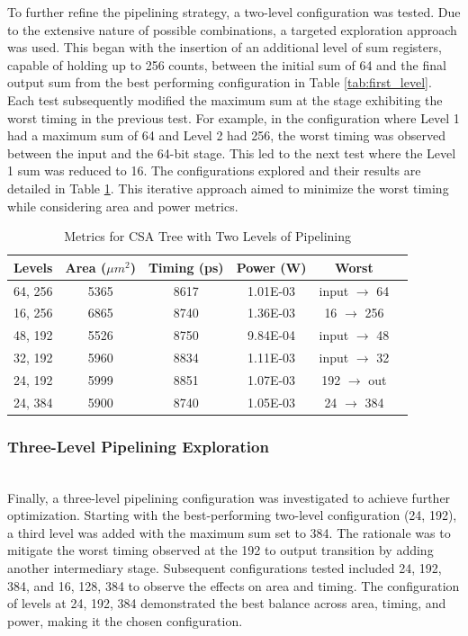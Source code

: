 \documentclass[conference]{IEEEtran}
\begin{document}
To further refine the pipelining strategy, a two-level configuration was tested. Due to the extensive nature of possible combinations, a targeted exploration approach was used. This began with the insertion of an additional level of sum registers, capable of holding up to 256 counts, between the initial sum of 64 and the final output sum from the best performing configuration in Table \ref{tab:first_level}. Each test subsequently modified the maximum sum at the stage exhibiting the worst timing in the previous test. For example, in the configuration where Level 1 had a maximum sum of 64 and Level 2 had 256, the worst timing was observed between the input and the 64-bit stage. This led to the next test where the Level 1 sum was reduced to 16. The configurations explored and their results are detailed in Table \ref{tab:two_level}. This iterative approach aimed to minimize the worst timing while considering area and power metrics.


\begin{table}[h]
    \centering
    \caption{Metrics for CSA Tree with Two Levels of Pipelining}
    \label{tab:two_level}
    \begin{tabular}{@{}cccccc@{}}
        \toprule
        \textbf{Levels} & \textbf{Area ($\mu m^2$)} & \textbf{Timing (ps)} & \textbf{Power (W)} & \textbf{Worst} \\
        \midrule
        64, 256 & 5365 & 8617 & 1.01E-03 & input $\rightarrow$ 64 \\
        16, 256 & 6865 & 8740 & 1.36E-03 & 16 $\rightarrow$ 256 \\
        48, 192 & 5526 & 8750 & 9.84E-04 & input $\rightarrow$ 48 \\
        32, 192 & 5960 & 8834 & 1.11E-03 & input $\rightarrow$ 32 \\
        24, 192 & 5999 & 8851 & 1.07E-03 & 192 $\rightarrow$ out\\
        24, 384 & 5900 & 8740 & 1.05E-03 & 24 $\rightarrow$ 384 \\
        \bottomrule
    \end{tabular}
\end{table}

\subsubsection{Three-Level Pipelining Exploration}
\hfill\\

Finally, a three-level pipelining configuration was investigated to achieve further optimization. Starting with the best-performing two-level configuration (24, 192), a third level was added with the maximum sum set to 384. The rationale was to mitigate the worst timing observed at the 192 to output transition by adding another intermediary stage. Subsequent configurations tested included 24, 192, 384, and 16, 128, 384 to observe the effects on area and timing. The configuration of levels at 24, 192, 384 demonstrated the best balance across area, timing, and power, making it the chosen configuration. 
\end{document}
